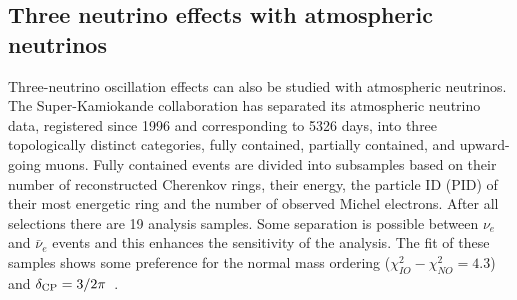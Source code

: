 \subsection{Three neutrino effects with atmospheric neutrinos}

Three-neutrino oscillation effects can also be studied with atmospheric neutrinos. The Super-Kamiokande collaboration has separated
its atmospheric neutrino data, registered since 1996 and corresponding to 5326 days, into three topologically distinct categories, fully contained, partially contained, and upward-going muons. Fully contained events are divided into subsamples based on their number of reconstructed Cherenkov rings, their
energy, the particle ID (PID) of their most energetic ring and the number of observed Michel electrons.  
After all selections there are 19 analysis samples.
Some separation is possible between $\nu_e$ and $\bar{\nu}_e$ events and this enhances the sensitivity of the analysis.
The fit of these samples shows some preference for the normal mass ordering ($\chi^2_{IO}-\chi^2_{NO}=4.3$) and $\delta_{\mathrm{CP}} = 3/2 \pi$~\cite{li2016}.
